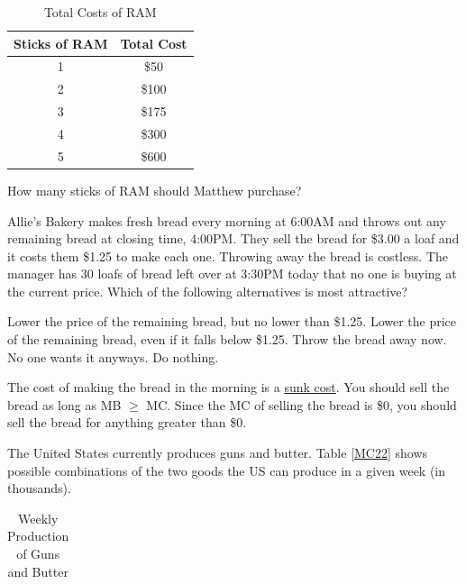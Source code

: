\documentclass[addpoints,11pt]{exam}
\theoremstyle{definition}
\begin{document}
\begin{questions}
	\begin{table}[H]
		\caption{Total Costs of RAM}
		\centering
		\begin{tabular}{ c| c} 
			
			Sticks of RAM &  Total Cost\\
			\hline
			1 & \$50 \\
			2 & \$100  \\
			3 & \$175 \\
			4 & \$300 \\
			5 & \$600 
		\end{tabular}
		\label{MC30}
	\end{table}
	
	How many sticks of RAM should Matthew purchase?
	
	\begin{choices}
	\end{choices}
	

	
	\question Allie's Bakery makes fresh bread every morning at 6:00AM and throws out any remaining bread at closing time, 4:00PM. They sell the bread for \$3.00 a loaf and it costs them \$1.25 to make each one. Throwing away the bread is costless. The manager has 30 loafs of bread left over at 3:30PM today that no one is buying at the current price. Which of the following alternatives is most attractive?
	\begin{choices}
		\choice Lower the price of the remaining bread, but no lower than \$1.25.
		\CorrectChoice Lower the price of the remaining bread, even if it falls below \$1.25.
		\choice Throw the bread away now. No one wants it anyways.
		\choice Do nothing.
	\end{choices}
	
	\begin{solution}
		The cost of making the bread in the morning is a \underline{sunk cost}. You should sell the bread as long as MB $\ge$ MC. Since the MC of selling the bread is \$0, you should sell the bread for anything greater than \$0.
	\end{solution}
	
	\question The United States currently produces guns and butter. Table \ref{MC22} shows possible combinations of the two goods the US can produce in a given week (in thousands). 	

	\begin{table}[H]
		\caption{Weekly Production of Guns and Butter}
		\centering
		\begin{tabular}{  c| c} 
			

\end{tabular}
\end{table}
\end{questions}
\end{document}
